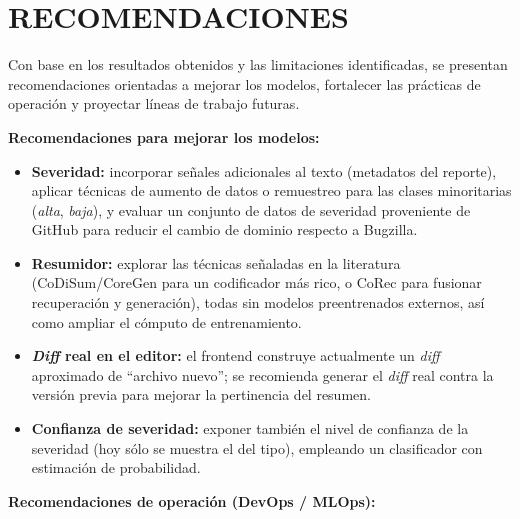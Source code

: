 %
%
\newpage
{}

%
%

\section*{RECOMENDACIONES}

Con base en los resultados obtenidos y las limitaciones identificadas, se presentan recomendaciones orientadas a mejorar los modelos, fortalecer las prácticas de operación y proyectar líneas de trabajo futuras.

\vspace{0.5em}

\textbf{Recomendaciones para mejorar los modelos:}

\begin{itemize}\itemsep=1pt
    \item \textbf{Severidad:} incorporar señales adicionales al texto (metadatos del reporte), aplicar técnicas de aumento de datos o remuestreo para las clases minoritarias (\textit{alta}, \textit{baja}), y evaluar un conjunto de datos de severidad proveniente de GitHub para reducir el cambio de dominio respecto a Bugzilla.
    \item \textbf{Resumidor:} explorar las técnicas señaladas en la literatura (CoDiSum/CoreGen para un codificador más rico, o CoRec para fusionar recuperación y generación), todas sin modelos preentrenados externos, así como ampliar el cómputo de entrenamiento.
    \item \textbf{\textit{Diff} real en el editor:} el frontend construye actualmente un \textit{diff} aproximado de ``archivo nuevo''; se recomienda generar el \textit{diff} real contra la versión previa para mejorar la pertinencia del resumen.
    \item \textbf{Confianza de severidad:} exponer también el nivel de confianza de la severidad (hoy sólo se muestra el del tipo), empleando un clasificador con estimación de probabilidad.
\end{itemize}

\vspace{0.5em}

\textbf{Recomendaciones de operación (DevOps / MLOps):}

